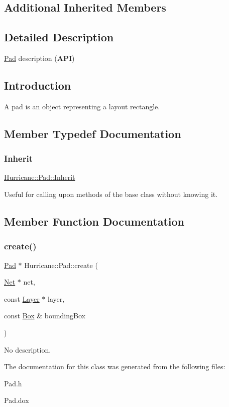 \subsection*{Additional Inherited Members}


\subsection{Detailed Description}
\hyperlink{classHurricane_1_1Pad}{Pad} description ({\bfseries A\+PI}) 

\hypertarget{classHurricane_1_1Pad_secPadIntro}{}\subsection{Introduction}\label{classHurricane_1_1Pad_secPadIntro}
A pad is an object representing a layout rectangle. 

\subsection{Member Typedef Documentation}
\mbox{\label{classHurricane_1_1Pad_aa44130a291ce3cb878d749fbf3e5437e}} 
\subsubsection{\texorpdfstring{Inherit}{Inherit}}
{\footnotesize\ttfamily \hyperlink{classHurricane_1_1Pad_aa44130a291ce3cb878d749fbf3e5437e}{Hurricane\+::\+Pad\+::\+Inherit}}

Useful for calling upon methods of the base class without knowing it. 

\subsection{Member Function Documentation}
\mbox{\label{classHurricane_1_1Pad_a0fdf586f9f815d375f54b40bfa027b24}} 
\subsubsection{\texorpdfstring{create()}{create()}}
{\footnotesize\ttfamily \hyperlink{classHurricane_1_1Pad}{Pad} $\ast$ Hurricane\+::\+Pad\+::create (\begin{DoxyParamCaption}\item[{\hyperlink{classHurricane_1_1Net}{Net} $\ast$}]{net,  }\item[{const \hyperlink{classHurricane_1_1Layer}{Layer} $\ast$}]{layer,  }\item[{const \hyperlink{classHurricane_1_1Box}{Box} \&}]{bounding\+Box }\end{DoxyParamCaption})\hspace{0.3cm}{\ttfamily [static]}}

No description. 

The documentation for this class was generated from the following files\+:\begin{DoxyCompactItemize}
\item 
Pad.\+h\item 
Pad.\+dox\end{DoxyCompactItemize}

